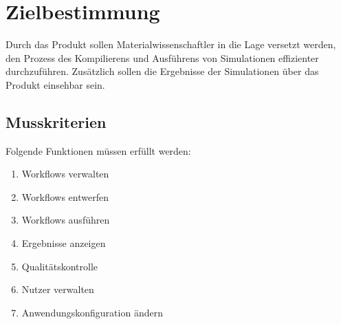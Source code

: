 \chapter{Zielbestimmung}
Durch das Produkt sollen Materialwissenschaftler in die Lage versetzt werden, den Prozess des Kompilierens und Ausführens von Simulationen effizienter durchzuführen. 
Zusätzlich sollen die Ergebnisse der Simulationen über das Produkt einsehbar sein. \newline
\section{Musskriterien}
Folgende Funktionen müssen erfüllt werden:
\renewcommand{\labelenumi}{/M\arabic{enumi}0/}
\begin{enumerate}
    \setlength\itemsep{-1em}
    \item Workflows verwalten
    \item Workflows entwerfen %
    \item Workflows ausführen
    \item Ergebnisse anzeigen
    \item Qualitätskontrolle
    \item Nutzer verwalten
    \item Anwendungskonfiguration ändern
\end{enumerate}
\newpage
